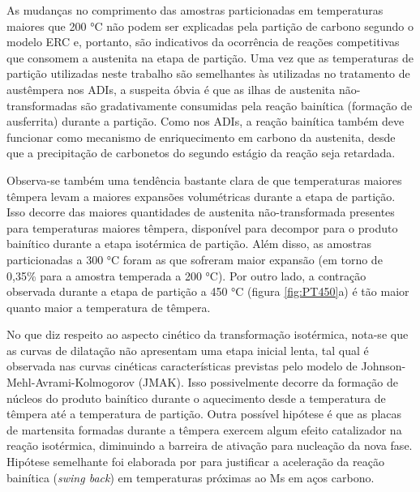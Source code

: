 As mudanças no comprimento das amostras particionadas em temperaturas maiores que 200 °C não podem ser explicadas pela partição de carbono segundo o modelo ERC e, portanto, são indicativos da ocorrência de reações competitivas que consomem a austenita na etapa de partição. Uma vez que as temperaturas de partição utilizadas neste trabalho são semelhantes às utilizadas no tratamento de austêmpera nos ADIs, a suspeita óbvia é que as ilhas de austenita não-transformadas são gradativamente consumidas pela reação bainítica (formação de ausferrita) durante a partição. Como nos ADIs, a reação bainítica também deve funcionar como mecanismo de enriquecimento em carbono da austenita, desde que a precipitação de carbonetos do segundo estágio da reação seja retardada.

Observa-se também uma tendência bastante clara de que temperaturas maiores têmpera levam a maiores expansões volumétricas durante a etapa de partição. Isso decorre das maiores quantidades de austenita não-transformada presentes para temperaturas maiores têmpera, disponível para decompor para o produto bainítico durante a etapa isotérmica de partição. Além disso, as amostras particionadas a 300 °C foram as que sofreram maior expansão (em torno de 0,35\% para a amostra temperada a 200 °C). Por outro lado, a contração observada durante a etapa de partição a 450 °C (figura \ref{fig:PT450}a) é tão maior quanto maior a temperatura de têmpera.

No que diz respeito ao aspecto cinético da transformação isotérmica, nota-se que as curvas de dilatação não apresentam uma etapa inicial lenta, tal qual é observada nas curvas cinéticas características previstas pelo modelo de Johnson-Mehl-Avrami-Kolmogorov (JMAK). Isso possivelmente decorre da formação de núcleos do produto bainítico durante o aquecimento desde a temperatura de têmpera até a temperatura de partição. Outra possível hipótese é que as placas de martensita formadas durante a têmpera exercem algum efeito catalizador na reação isotérmica, diminuindo a barreira de ativação para nucleação da nova fase. Hipótese semelhante foi elaborada por  para justificar a aceleração da reação bainítica (\textit{swing back}) em temperaturas próximas ao Ms em aços carbono.

